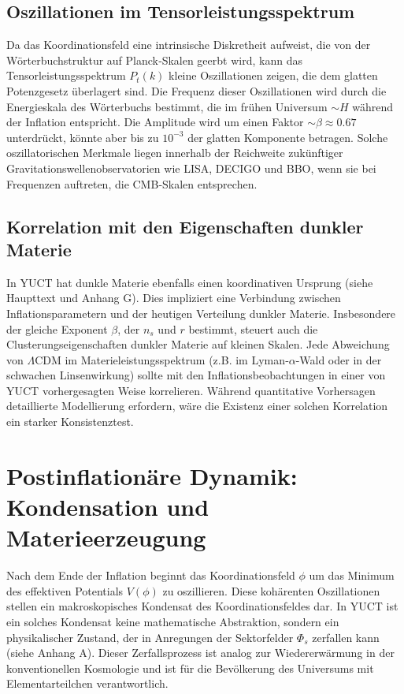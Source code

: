 \documentclass[12pt]{article}
\theoremstyle{remark}
\begin{document}
	\subsection{Oszillationen im Tensorleistungsspektrum}
	
	Da das Koordinationsfeld eine intrinsische Diskretheit aufweist, die von der Wörterbuchstruktur auf Planck‑Skalen geerbt wird, kann das Tensorleistungsspektrum $P_t(k)$ kleine Oszillationen zeigen, die dem glatten Potenzgesetz überlagert sind. Die Frequenz dieser Oszillationen wird durch die Energieskala des Wörterbuchs bestimmt, die im frühen Universum $\sim H$ während der Inflation entspricht. Die Amplitude wird um einen Faktor $\sim \beta \approx 0.67$ unterdrückt, könnte aber bis zu $10^{-3}$ der glatten Komponente betragen. Solche oszillatorischen Merkmale liegen innerhalb der Reichweite zukünftiger Gravitationswellenobservatorien wie LISA, DECIGO und BBO, wenn sie bei Frequenzen auftreten, die CMB‑Skalen entsprechen.
	
	\subsection{Korrelation mit den Eigenschaften dunkler Materie}
	
	In YUCT hat dunkle Materie ebenfalls einen koordinativen Ursprung (siehe Haupttext und Anhang G). Dies impliziert eine Verbindung zwischen Inflationsparametern und der heutigen Verteilung dunkler Materie. Insbesondere der gleiche Exponent $\beta$, der $n_s$ und $r$ bestimmt, steuert auch die Clusterungseigenschaften dunkler Materie auf kleinen Skalen. Jede Abweichung von $\Lambda$CDM im Materieleistungsspektrum (z.B. im Lyman‑$\alpha$-Wald oder in der schwachen Linsenwirkung) sollte mit den Inflationsbeobachtungen in einer von YUCT vorhergesagten Weise korrelieren. Während quantitative Vorhersagen detaillierte Modellierung erfordern, wäre die Existenz einer solchen Korrelation ein starker Konsistenztest.
	
	\section{Postinflationäre Dynamik: Kondensation und Materieerzeugung}
	\label{sec:postinflation}
	
	Nach dem Ende der Inflation beginnt das Koordinationsfeld $\phi$ um das Minimum des effektiven Potentials $V(\phi)$ zu oszillieren. Diese kohärenten Oszillationen stellen ein makroskopisches Kondensat des Koordinationsfeldes dar. In YUCT ist ein solches Kondensat keine mathematische Abstraktion, sondern ein physikalischer Zustand, der in Anregungen der Sektorfelder $\Phi_s$ zerfallen kann (siehe Anhang A). Dieser Zerfallsprozess ist analog zur Wiedererwärmung in der konventionellen Kosmologie und ist für die Bevölkerung des Universums mit Elementarteilchen verantwortlich.
	
\end{document}
